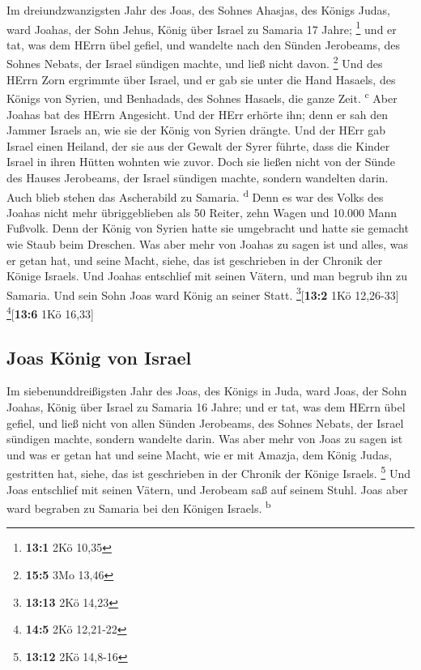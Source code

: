  Im dreiundzwanzigsten Jahr des Joas, des Sohnes Ahasjas,
des Königs Judas, ward Joahas, der Sohn Jehus, König über Israel zu
Samaria 17 Jahre; \footnote{\textbf{13:1} 2Kö 10,35}  und
er tat, was dem HErrn übel gefiel, und wandelte nach den Sünden
Jerobeams, des Sohnes Nebats, der Israel sündigen machte, und ließ nicht
davon. \footnote{\textbf{15:5} 3Mo 13,46}  Und des HErrn
Zorn ergrimmte über Israel, und er gab sie unter die Hand Hasaels, des
Königs von Syrien, und Benhadads, des Sohnes Hasaels, die ganze Zeit.
\textsuperscript{c}  Aber Joahas bat des HErrn Angesicht.
Und der HErr erhörte ihn; denn er sah den Jammer Israels an, wie sie der
König von Syrien drängte.  Und der HErr gab Israel einen
Heiland, der sie aus der Gewalt der Syrer führte, dass die Kinder Israel
in ihren Hütten wohnten wie zuvor.  Doch sie ließen nicht
von der Sünde des Hauses Jerobeams, der Israel sündigen machte, sondern
wandelten darin. Auch blieb stehen das Ascherabild zu Samaria.
\textsuperscript{d}  Denn es war des Volks des Joahas
nicht mehr übriggeblieben als 50 Reiter, zehn Wagen und 10.000 Mann
Fußvolk. Denn der König von Syrien hatte sie umgebracht und hatte sie
gemacht wie Staub beim Dreschen.  Was aber mehr von Joahas
zu sagen ist und alles, was er getan hat, und seine Macht, siehe, das
ist geschrieben in der Chronik der Könige Israels.  Und
Joahas entschlief mit seinen Vätern, und man begrub ihn zu Samaria. Und
sein Sohn Joas ward König an seiner Statt. \footnote{\textbf{13:13} 2Kö
  14,23}{[}\textbf{13:2} 1Kö 12,26-33{]} \footnote{\textbf{14:5} 2Kö
  12,21-22}{[}\textbf{13:6} 1Kö 16,33{]}

\hypertarget{joas-kuxf6nig-von-israel}{%
\subsection{Joas König von Israel}\label{joas-kuxf6nig-von-israel}}

 Im siebenunddreißigsten Jahr des Joas, des Königs in
Juda, ward Joas, der Sohn Joahas, König über Israel zu Samaria 16 Jahre;
 und er tat, was dem HErrn übel gefiel, und ließ nicht
von allen Sünden Jerobeams, des Sohnes Nebats, der Israel sündigen
machte, sondern wandelte darin.  Was aber mehr von Joas
zu sagen ist und was er getan hat und seine Macht, wie er mit Amazja,
dem König Judas, gestritten hat, siehe, das ist geschrieben in der
Chronik der Könige Israels. \footnote{\textbf{13:12} 2Kö 14,8-16}
 Und Joas entschlief mit seinen Vätern, und Jerobeam saß
auf seinem Stuhl. Joas aber ward begraben zu Samaria bei den Königen
Israels. \textsuperscript{b}

